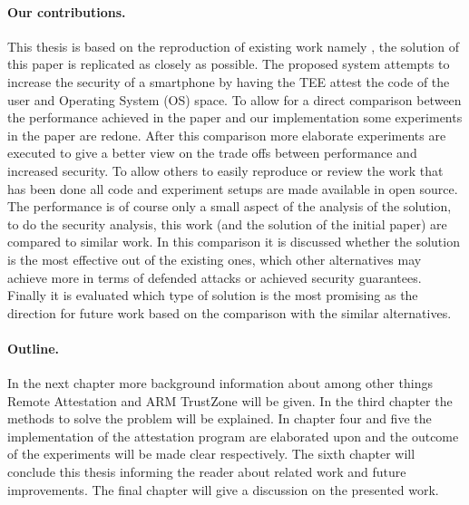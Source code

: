 \documentclass{report}
\begin{document}
\paragraph*{Our contributions.}
This thesis is based on the reproduction of existing work namely \cite{LingZhen2021Sbtb}, the solution of this paper is replicated as closely as possible. The proposed system attempts to increase the security of a smartphone by having the TEE attest the code of the user and Operating System (OS) space. To allow for a direct comparison between the performance achieved in the paper and our implementation some experiments in the paper are redone. After this comparison more elaborate experiments are executed to give a better view on the trade offs between performance and increased security. To allow others to easily reproduce or review the work that has been done all code and experiment setups are made available in open source. The performance is of course only a small aspect of the analysis of the solution, to do the security analysis, this work (and the solution of the initial paper) are compared to similar work. In this comparison it is discussed whether the solution is the most effective out of the existing ones, which other alternatives may achieve more in terms of defended attacks or achieved security guarantees. Finally it is evaluated which type of solution is the most promising as the direction for future work based on the comparison with the similar alternatives.

\paragraph*{Outline.}
In the next chapter more background information about among other things Remote Attestation and ARM TrustZone will be given. In the third chapter the methods to solve the problem will be explained. In chapter four and five the implementation of the attestation program are elaborated upon and the outcome of the experiments will be made clear respectively. The sixth chapter will conclude this thesis informing the reader about related work and future improvements. The final chapter will give a discussion on the presented work.
\end{document}
